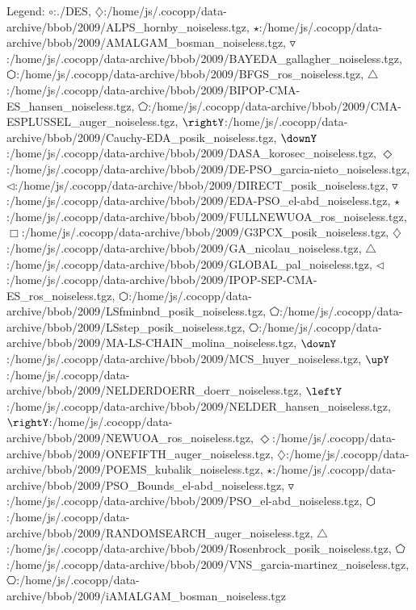 Legend: {\color{NavyBlue}$\circ$}:./DES, {\color{Magenta}$\diamondsuit$}:/home/js/.cocopp/data-archive/bbob/2009/ALPS\_hornby\_noiseless.tgz, {\color{Orange}$\star$}:/home/js/.cocopp/data-archive/bbob/2009/AMALGAM\_bosman\_noiseless.tgz, {\color{CornflowerBlue}$\triangledown$}:/home/js/.cocopp/data-archive/bbob/2009/BAYEDA\_gallagher\_noiseless.tgz, {\color{red}$\varhexagon$}:/home/js/.cocopp/data-archive/bbob/2009/BFGS\_ros\_noiseless.tgz, {\color{YellowGreen}$\triangle$}:/home/js/.cocopp/data-archive/bbob/2009/BIPOP-CMA-ES\_hansen\_noiseless.tgz, {\color{cyan}$\pentagon$}:/home/js/.cocopp/data-archive/bbob/2009/CMA-ESPLUSSEL\_auger\_noiseless.tgz, {\color{GreenYellow}$\rightY$}:/home/js/.cocopp/data-archive/bbob/2009/Cauchy-EDA\_posik\_noiseless.tgz, {\color{ForestGreen}$\downY$}:/home/js/.cocopp/data-archive/bbob/2009/DASA\_korosec\_noiseless.tgz, {\color{Lavender}$\Diamond$}:/home/js/.cocopp/data-archive/bbob/2009/DE-PSO\_garcia-nieto\_noiseless.tgz, {\color{SkyBlue}$\triangleleft$}:/home/js/.cocopp/data-archive/bbob/2009/DIRECT\_posik\_noiseless.tgz, {\color{NavyBlue}$\triangledown$}:/home/js/.cocopp/data-archive/bbob/2009/EDA-PSO\_el-abd\_noiseless.tgz, {\color{red}$\star$}:/home/js/.cocopp/data-archive/bbob/2009/FULLNEWUOA\_ros\_noiseless.tgz, {\color{Goldenrod}$\Box$}:/home/js/.cocopp/data-archive/bbob/2009/G3PCX\_posik\_noiseless.tgz, {\color{VioletRed}$\diamondsuit$}:/home/js/.cocopp/data-archive/bbob/2009/GA\_nicolau\_noiseless.tgz, {\color{CornflowerBlue}$\triangle$}:/home/js/.cocopp/data-archive/bbob/2009/GLOBAL\_pal\_noiseless.tgz, {\color{Orange}$\triangleleft$}:/home/js/.cocopp/data-archive/bbob/2009/IPOP-SEP-CMA-ES\_ros\_noiseless.tgz, {\color{Magenta}$\varhexagon$}:/home/js/.cocopp/data-archive/bbob/2009/LSfminbnd\_posik\_noiseless.tgz, {\color{Gray}$\pentagon$}:/home/js/.cocopp/data-archive/bbob/2009/LSstep\_posik\_noiseless.tgz, {\color{SkyBlue}$\hexagon$}:/home/js/.cocopp/data-archive/bbob/2009/MA-LS-CHAIN\_molina\_noiseless.tgz, {\color{Lavender}$\downY$}:/home/js/.cocopp/data-archive/bbob/2009/MCS\_huyer\_noiseless.tgz, {\color{ForestGreen}$\upY$}:/home/js/.cocopp/data-archive/bbob/2009/NELDERDOERR\_doerr\_noiseless.tgz, {\color{LimeGreen}$\leftY$}:/home/js/.cocopp/data-archive/bbob/2009/NELDER\_hansen\_noiseless.tgz, {\color{YellowGreen}$\rightY$}:/home/js/.cocopp/data-archive/bbob/2009/NEWUOA\_ros\_noiseless.tgz, {\color{GreenYellow}$\Diamond$}:/home/js/.cocopp/data-archive/bbob/2009/ONEFIFTH\_auger\_noiseless.tgz, {\color{NavyBlue}$\diamondsuit$}:/home/js/.cocopp/data-archive/bbob/2009/POEMS\_kubalik\_noiseless.tgz, {\color{Magenta}$\star$}:/home/js/.cocopp/data-archive/bbob/2009/PSO\_Bounds\_el-abd\_noiseless.tgz, {\color{Orange}$\triangledown$}:/home/js/.cocopp/data-archive/bbob/2009/PSO\_el-abd\_noiseless.tgz, {\color{CornflowerBlue}$\varhexagon$}:/home/js/.cocopp/data-archive/bbob/2009/RANDOMSEARCH\_auger\_noiseless.tgz, {\color{red}$\triangle$}:/home/js/.cocopp/data-archive/bbob/2009/Rosenbrock\_posik\_noiseless.tgz, {\color{YellowGreen}$\pentagon$}:/home/js/.cocopp/data-archive/bbob/2009/VNS\_garcia-martinez\_noiseless.tgz, {\color{cyan}$\hexagon$}:/home/js/.cocopp/data-archive/bbob/2009/iAMALGAM\_bosman\_noiseless.tgz